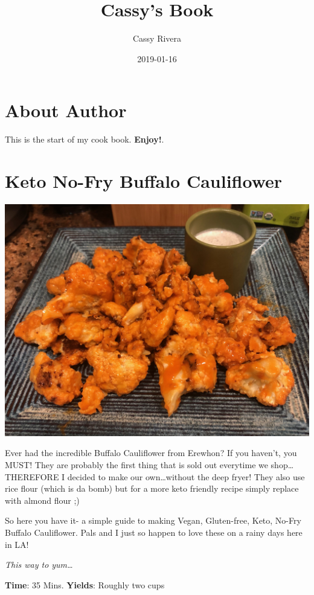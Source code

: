 \documentclass[]{book}
\title{Cassy's Book}
\author{Cassy Rivera}
\date{2019-01-16}
\begin{document}
\maketitle

{
\setcounter{tocdepth}{1}
\tableofcontents
}
\chapter{About Author}\label{about-author}

This is the start of my cook book. \textbf{Enjoy!}.

\chapter{Keto No-Fry Buffalo Cauliflower}\label{intro}

\includegraphics{../food.jpeg}

Ever had the incredible Buffalo Cauliflower from Erewhon? If you
haven't, you MUST! They are probably the first thing that is sold out
everytime we shop\ldots{}THEREFORE I decided to make our
own\ldots{}without the deep fryer! They also use rice flour (which is da
bomb) but for a more keto friendly recipe simply replace with almond
flour ;)

So here you have it- a simple guide to making Vegan, Gluten-free, Keto,
No-Fry Buffalo Cauliflower. Pals and I just so happen to love these on a
rainy days here in LA!

\emph{This way to yum\ldots{}}

\textbf{\textbf{Time}}: 35 Mins. \textbf{\textbf{Yields}}: Roughly two
cups
\end{document}
